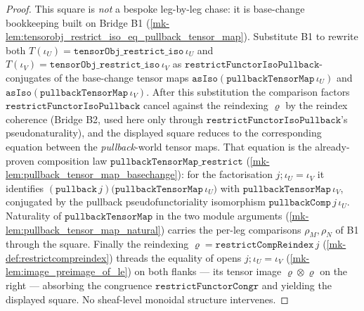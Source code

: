 \begin{proof}
  This square is \emph{not} a bespoke leg-by-leg chase: it is base-change bookkeeping built on
  Bridge B1 (\ref{mk-lem:tensorobj_restrict_iso_eq_pullback_tensor_map}). Substitute B1 to rewrite
  both \(T(\iota_U) = \mathtt{tensorObj\_restrict\_iso}\,\iota_U\) and
  \(T(\iota_V) = \mathtt{tensorObj\_restrict\_iso}\,\iota_V\) as
  \(\mathtt{restrictFunctorIsoPullback}\)-conjugates of the base-change tensor maps
  \(\mathtt{asIso}(\mathtt{pullbackTensorMap}\,\iota_U)\) and
  \(\mathtt{asIso}(\mathtt{pullbackTensorMap}\,\iota_V)\). After this substitution the comparison
  factors \(\mathtt{restrictFunctorIsoPullback}\) cancel against the reindexing \(\varrho\) by the
  reindex coherence (Bridge B2, used here only through
  \(\mathtt{restrictFunctorIsoPullback}\)'s pseudonaturality), and the displayed square reduces to
  the corresponding equation between the \emph{pullback}-world tensor maps. That equation is the
  already-proven composition law \(\mathtt{pullbackTensorMap\_restrict}\)
  (\ref{mk-lem:pullback_tensor_map_basechange}): for the factorisation
  \(j \mathbin{;} \iota_U = \iota_V\) it identifies
  \((\mathtt{pullback}\,j)\bigl(\mathtt{pullbackTensorMap}\,\iota_U\bigr)\) with
  \(\mathtt{pullbackTensorMap}\,\iota_V\), conjugated by the pullback pseudofunctoriality
  isomorphism \(\mathtt{pullbackComp}\,j\,\iota_U\). Naturality of \(\mathtt{pullbackTensorMap}\) in
  the two module arguments (\ref{mk-lem:pullback_tensor_map_natural}) carries the per-leg comparisons
  \(\rho_M, \rho_N\) of B1 through the square. Finally the reindexing
  \(\varrho = \mathtt{restrictCompReindex}\,j\) (\ref{mk-def:restrictcompreindex}) threads the
  equality of opens \(j \mathbin{;} \iota_U = \iota_V\) (\ref{mk-lem:image_preimage_of_le}) on both
  flanks --- its tensor image \(\varrho \otimes \varrho\) on the right --- absorbing the
  congruence \(\mathtt{restrictFunctorCongr}\) and yielding the displayed square. No sheaf-level
  monoidal structure intervenes.
\end{proof}

